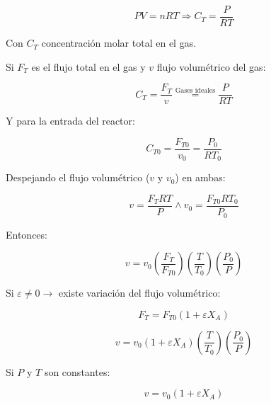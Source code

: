             \[PV = nRT \Rightarrow C_{T} = \frac{P}{RT}\]
            
            Con \(C_{T}\) concentración molar total en el gas.
            
            Si \(F_{T}\) es el flujo total en el gas y \(v\) flujo volumétrico del gas:
            
            \[C_{T} = \frac{F_{T}}{v} \overset{\text{Gases ideales}}{=} \frac{P}{RT}\]
            
            Y para la entrada del reactor:
            
            \[C_{T0} = \frac{F_{T0}}{v_{0}} = \frac{P_{0}}{R{T}_{0}}\]
            
            Despejando el flujo volumétrico (\(v\) y \(v_{0}\)) en ambas:
            
            \[v = \frac{{F}_{T} RT}{P} \wedge v_{0} = \frac{{F}_{T0} R{T}_{0}}{{P}_{0}}\]
            
            Entonces:
            
            \begin{equation}
            \label{eq:reactor_cont_flujo_vol}
                v = v_{0} \left ( \frac{{F}_{T}}{F_{T0}} \right ) \left ( \frac{T}{{T}_{0}} \right ) \left ( \frac{{P}_{0}}{P} \right )
            \end{equation}
            
            Si \(\varepsilon \neq 0 \rightarrow\) existe variación del flujo volumétrico:
            
            \[F_{T} = F_{T0} \left ( 1 + \varepsilon X_{A} \right )\]
            
            \begin{equation}
            \label{eq:reactor_cont_flujo_vol_var}
                v = v_{0} \left ( 1 + \varepsilon X_{A} \right ) \left ( \frac{T}{{T}_{0}} \right ) \left ( \frac{{P}_{0}}{P} \right )
            \end{equation}
            
            Si \(P\) y \(T\) son constantes:
            
            \begin{equation}
            \label{eq:reactor_cont_flujo_vol_var_pt_cte}
                v = v_{0} \left ( 1 + \varepsilon X_{A} \right )
            \end{equation}
            
            
